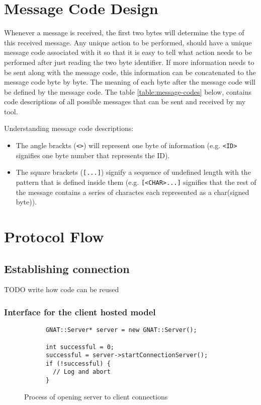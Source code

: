 \section{Message Code Design}
Whenever a message is received, the first two bytes will determine the type of this received message. Any unique action to be performed, should have a unique message code associated with it so that it is easy to tell what action needs to be performed after just reading the two byte identifier. If more information needs to be sent along with the message code, this information can be concatenated to the message code byte by byte. The meaning of each byte after the message code will be defined by the message code. The table \ref{table:message-codes} below, contains code descriptions of all possible messages that can be sent and received by my tool.

Understanding message code descriptions:
\begin{itemize}
\item The angle brackts (\lstinline{<>}) will represent one byte of information (e.g. \lstinline{<ID>} signifies one byte number that represents the ID).
\item The square brackets (\lstinline{[...]}) signify a sequence of undefined length with the pattern that is defined inside them (e.g. \lstinline{[<CHAR>...]} signifies that the rest of the message contains a series of charactes each represented as a char(signed byte)).
\end{itemize}
\vfill


\newpage

\section{Protocol Flow}

\subsection{Establishing connection}
TODO write how code can be reused



\newpage
\subsubsection{Interface for the client hosted model}

\begin{figure}[!h]
  \centering
  \begin{lstlisting}
      GNAT::Server* server = new GNAT::Server();

      int successful = 0;
      successful = server->startConnectionServer();
      if (!successful) {
        // Log and abort
      }
  \end{lstlisting}
  \caption{Process of opening server to client connections}
  \label{code:server_conn}
\end{figure}

